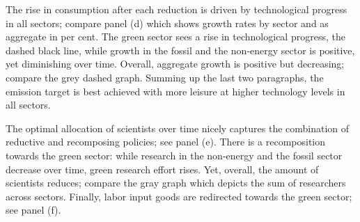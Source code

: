 The rise in consumption after each reduction is driven by technological progress in all sectors; compare panel (d) which shows growth rates by sector and as aggregate in per cent. 
The green sector sees a rise in technological progress, the dashed black line, while growth in the fossil and the non-energy sector is positive, yet diminishing over time. Overall, aggregate growth is positive but decreasing; compare the grey dashed graph. 
Summing up the last two paragraphs, the emission target is best achieved with more leisure at higher technology levels in all sectors. 

The optimal allocation of scientists over time nicely captures the combination of reductive and recomposing policies; see panel (e). There is a recomposition towards the green sector: while research in the non-energy and the fossil sector decrease over time, green research effort rises. Yet, overall, the amount of scientists reduces; compare the gray graph which depicts the sum of researchers across sectors.  
Finally, labor input goods are redirected towards the green sector; see panel (f). 

